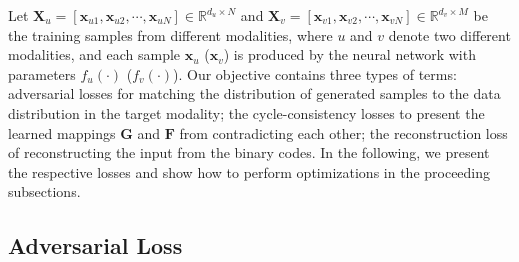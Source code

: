 \documentclass[10pt,journal,twocolumn]{IEEEtran}
\begin{document}
Let $\boldsymbol X_u= [\boldsymbol x_{u1}, \boldsymbol x_{u2},\cdots, \boldsymbol x_{uN}]\in \mathbb{R}^{d_u \times N}$ and $\boldsymbol X_v= [\boldsymbol x_{v1}, \boldsymbol x_{v2},\cdots, \boldsymbol x_{vN}]\in \mathbb{R}^{d_v \times M}$ be the training samples from different modalities, where $u$ and $v$ denote two different modalities, and each sample $\boldsymbol x_u$ ($\boldsymbol x_v$) is produced by the neural network with parameters $f_u (\cdot)$ ($f_v(\cdot)$). Our objective contains three types of terms: adversarial losses \cite{GAN} for matching the distribution of generated samples to the data distribution in the target modality; the cycle-consistency losses \cite{CycleGAN} to present the learned mappings $\boldsymbol G$ and $\boldsymbol F$ from contradicting each other; the reconstruction loss of reconstructing the input from the binary codes. In the following, we present the respective losses and show how to perform optimizations in the proceeding subsections.

\subsection{Adversarial Loss}
\end{document}
